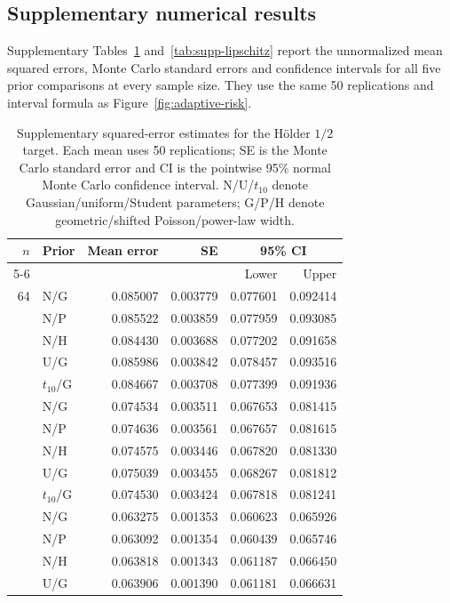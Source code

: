 \documentclass[11pt,a4paper]{article}
\theoremstyle{remark}
\begin{document}
\clearpage
\subsection{Supplementary numerical results}
\label{app:simulation-supplementary}
Supplementary Tables~\ref{tab:supp-half} and~\ref{tab:supp-lipschitz}
report the unnormalized mean squared errors, Monte Carlo standard errors
and confidence intervals for all five prior comparisons at every sample
size. They use the same 50 replications and interval formula as
Figure~\ref{fig:adaptive-risk}.

\begin{table}[H]
\caption{Supplementary squared-error estimates for the H\"older $1/2$ target. Each mean uses 50 replications; SE is the Monte Carlo standard error and CI is the pointwise 95\% normal Monte Carlo confidence interval. N/U/$t_{10}$ denote Gaussian/uniform/Student parameters; G/P/H denote geometric/shifted Poisson/power-law width.}
\label{tab:supp-half}
\centering\small
\begin{tabular}{@{}rlrrrr@{}}
\toprule
$n$ & Prior & Mean error & SE & \multicolumn{2}{c}{95\% CI}\\
\cmidrule(l){5-6}
 & & & & Lower & Upper\\
\midrule
64 & N/G & 0.085007 & 0.003779 & 0.077601 & 0.092414\\
 & N/P & 0.085522 & 0.003859 & 0.077959 & 0.093085\\
 & N/H & 0.084430 & 0.003688 & 0.077202 & 0.091658\\
 & U/G & 0.085986 & 0.003842 & 0.078457 & 0.093516\\
 & $t_{10}$/G & 0.084667 & 0.003708 & 0.077399 & 0.091936\\
\addlinespace[3pt]
128 & N/G & 0.074534 & 0.003511 & 0.067653 & 0.081415\\
 & N/P & 0.074636 & 0.003561 & 0.067657 & 0.081615\\
 & N/H & 0.074575 & 0.003446 & 0.067820 & 0.081330\\
 & U/G & 0.075039 & 0.003455 & 0.068267 & 0.081812\\
 & $t_{10}$/G & 0.074530 & 0.003424 & 0.067818 & 0.081241\\
\addlinespace[3pt]
256 & N/G & 0.063275 & 0.001353 & 0.060623 & 0.065926\\
 & N/P & 0.063092 & 0.001354 & 0.060439 & 0.065746\\
 & N/H & 0.063818 & 0.001343 & 0.061187 & 0.066450\\
 & U/G & 0.063906 & 0.001390 & 0.061181 & 0.066631\\

\end{tabular}
\end{table}
\end{document}
